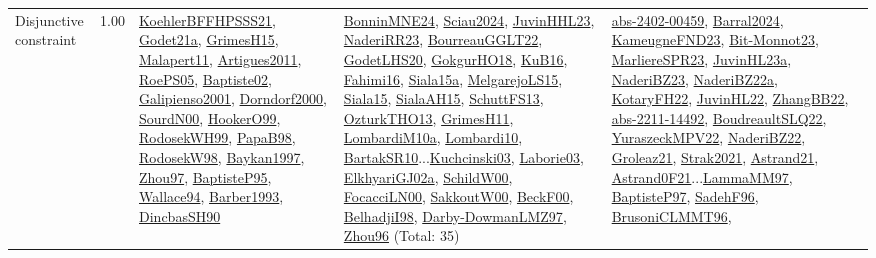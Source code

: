 {\begin{longtable}{p{3cm}r>{\raggedright\arraybackslash}p{6cm}>{\raggedright\arraybackslash}p{6cm}>{\raggedright\arraybackslash}p{8cm}}
\index{Disjunctive constraint}\index{Constraints!Disjunctive constraint}Disjunctive constraint &  1.00 & \hyperref[detail:KoehlerBFFHPSSS21]{KoehlerBFFHPSSS21}, \hyperref[detail:Godet21a]{Godet21a}, \hyperref[detail:GrimesH15]{GrimesH15}, \hyperref[detail:Malapert11]{Malapert11}, \hyperref[detail:Artigues2011]{Artigues2011}, \hyperref[detail:RoePS05]{RoePS05}, \hyperref[detail:Baptiste02]{Baptiste02}, \hyperref[detail:Galipienso2001]{Galipienso2001}, \hyperref[detail:Dorndorf2000]{Dorndorf2000}, \hyperref[detail:SourdN00]{SourdN00}, \hyperref[detail:HookerO99]{HookerO99}, \hyperref[detail:RodosekWH99]{RodosekWH99}, \hyperref[detail:PapaB98]{PapaB98}, \hyperref[detail:RodosekW98]{RodosekW98}, \hyperref[detail:Baykan1997]{Baykan1997}, \hyperref[detail:Zhou97]{Zhou97}, \hyperref[detail:BaptisteP95]{BaptisteP95}, \hyperref[detail:Wallace94]{Wallace94}, \hyperref[detail:Barber1993]{Barber1993}, \hyperref[detail:DincbasSH90]{DincbasSH90} & \hyperref[detail:BonninMNE24]{BonninMNE24}, \hyperref[detail:Sciau2024]{Sciau2024}, \hyperref[detail:JuvinHHL23]{JuvinHHL23}, \hyperref[detail:NaderiRR23]{NaderiRR23}, \hyperref[detail:BourreauGGLT22]{BourreauGGLT22}, \hyperref[detail:GodetLHS20]{GodetLHS20}, \hyperref[detail:GokgurHO18]{GokgurHO18}, \hyperref[detail:KuB16]{KuB16}, \hyperref[detail:Fahimi16]{Fahimi16}, \hyperref[detail:Siala15a]{Siala15a}, \hyperref[detail:MelgarejoLS15]{MelgarejoLS15}, \hyperref[detail:Siala15]{Siala15}, \hyperref[detail:SialaAH15]{SialaAH15}, \hyperref[detail:SchuttFS13]{SchuttFS13}, \hyperref[detail:OzturkTHO13]{OzturkTHO13}, \hyperref[detail:GrimesH11]{GrimesH11}, \hyperref[detail:LombardiM10a]{LombardiM10a}, \hyperref[detail:Lombardi10]{Lombardi10}, \hyperref[detail:BartakSR10]{BartakSR10}...\hyperref[detail:Kuchcinski03]{Kuchcinski03}, \hyperref[detail:Laborie03]{Laborie03}, \hyperref[detail:ElkhyariGJ02a]{ElkhyariGJ02a}, \hyperref[detail:SchildW00]{SchildW00}, \hyperref[detail:FocacciLN00]{FocacciLN00}, \hyperref[detail:SakkoutW00]{SakkoutW00}, \hyperref[detail:BeckF00]{BeckF00}, \hyperref[detail:BelhadjiI98]{BelhadjiI98}, \hyperref[detail:Darby-DowmanLMZ97]{Darby-DowmanLMZ97}, \hyperref[detail:Zhou96]{Zhou96} (Total: 35) & \hyperref[detail:abs-2402-00459]{abs-2402-00459}, \hyperref[detail:Barral2024]{Barral2024}, \hyperref[detail:KameugneFND23]{KameugneFND23}, \hyperref[detail:Bit-Monnot23]{Bit-Monnot23}, \hyperref[detail:MarliereSPR23]{MarliereSPR23}, \hyperref[detail:JuvinHL23a]{JuvinHL23a}, \hyperref[detail:NaderiBZ23]{NaderiBZ23}, \hyperref[detail:NaderiBZ22a]{NaderiBZ22a}, \hyperref[detail:KotaryFH22]{KotaryFH22}, \hyperref[detail:JuvinHL22]{JuvinHL22}, \hyperref[detail:ZhangBB22]{ZhangBB22}, \hyperref[detail:abs-2211-14492]{abs-2211-14492}, \hyperref[detail:BoudreaultSLQ22]{BoudreaultSLQ22}, \hyperref[detail:YuraszeckMPV22]{YuraszeckMPV22}, \hyperref[detail:NaderiBZ22]{NaderiBZ22}, \hyperref[detail:Groleaz21]{Groleaz21}, \hyperref[detail:Strak2021]{Strak2021}, \hyperref[detail:Astrand21]{Astrand21}, \hyperref[detail:Astrand0F21]{Astrand0F21}...\hyperref[detail:LammaMM97]{LammaMM97}, \hyperref[detail:BaptisteP97]{BaptisteP97}, \hyperref[detail:SadehF96]{SadehF96}, \hyperref[detail:BrusoniCLMMT96]{BrusoniCLMMT96}, 
\end{longtable}}
